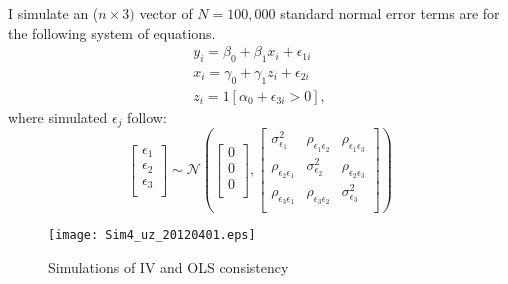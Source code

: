 \documentclass{article}[11pt,subeqn]
\begin{document}
\begin{spacing}{1.25}
I simulate an ($n \times 3)$ vector of $N=100,000$ standard normal error terms are for the following system of equations.\\
\begin{eqnarray}
\label{eqn:MC1}
y_i=\beta_0+\beta_1 x_i + \epsilon_{1i} \nonumber\\
x_i=\gamma_0 + \gamma_1 z_i + \epsilon_{2i} \nonumber\\
z_i=1[\alpha_0+\epsilon_{3i}>0], \nonumber
\end{eqnarray} 
where simulated $\epsilon_j$ follow:
\begin{equation}
\begin{bmatrix}
\epsilon_1\\
\epsilon_2\\
\epsilon_3\\
\end{bmatrix}
\sim \mathcal{N}
\left(\begin{bmatrix}
0\\
0\\
0\\
\end{bmatrix}
,
\begin{bmatrix}
\sigma_{\epsilon_1}^2 &  \rho_{\epsilon_1\epsilon_2} &  \rho_{\epsilon_1\epsilon_3}\\
\rho_{\epsilon_2\epsilon_1} & \sigma_{\epsilon_2}^2 &  \rho_{\epsilon_2\epsilon_3} \\
\rho_{\epsilon_3\epsilon_1}&  \rho_{\epsilon_3\epsilon_2}& \sigma_{\epsilon_3}^2 \\
\end{bmatrix}\right)
\end{equation}

\begin{figure}
\caption{Simulations of IV and OLS consistency}
\label{fig:MC}
\begin{center}
\vspace{-4mm}
\texttt{[image: Sim4\_uz\_20120401.eps]}
\end{center}
\end{figure}



\end{spacing}
\end{document}
